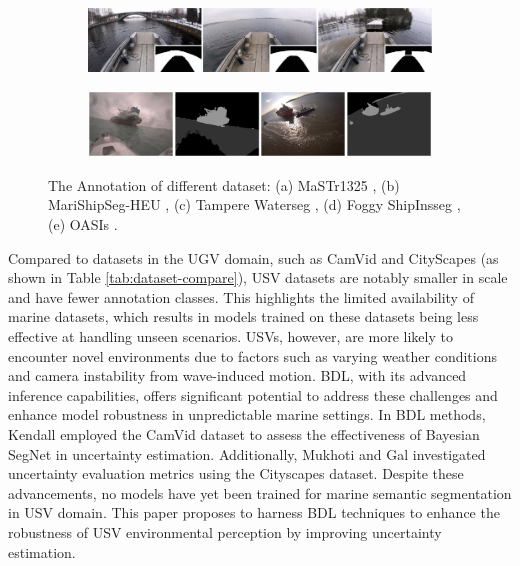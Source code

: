 \begin{figure}[ht]
\begin{minipage}{0.49\textwidth}
\begin{subfigure}[b]{1\textwidth}
        \caption{}
        \label{fig:foggy}
    \end{subfigure}
    \hfill
    \begin{subfigure}[b]{1\textwidth}
        \centering
        \includegraphics[width=\textwidth]{figures/D_tampere-waterseg.jpg}
        \caption{}
        \label{fig:tampere}
    \end{subfigure}
    \end{minipage}
    \hfill
    \centering
    \begin{subfigure}[b]{0.9\textwidth}
        \centering
        \includegraphics[width=\textwidth]{figures/OASIs/official-annotation.png}
        \caption{}
        \label{fig:oasis}
    \end{subfigure}
    \caption{The Annotation of different dataset: (a) MaSTr1325 \cite{MaSTr1325}, (b) MariShipSeg-HEU \cite{marishipseg},
    (c) Tampere Waterseg \cite{tampere}, (d) Foggy ShipInsseg \cite{foggy}, (e) OASIs \cite{OASIs}.}
    \label{fig:dataset-compare}
\end{figure}

Compared to datasets in the UGV domain, such as CamVid \cite{CamVid} and CityScapes \cite{Cityscapes} 
(as shown in Table \ref{tab:dataset-compare}), USV datasets are notably smaller in scale and have fewer annotation 
classes. This highlights the limited availability of marine datasets, which results in models trained on these 
datasets being less effective at handling unseen scenarios. USVs, however, are more likely to encounter novel 
environments due to factors such as varying weather conditions and camera instability from wave-induced motion. 
BDL, with its advanced inference capabilities, offers significant potential to address these challenges and enhance 
model robustness in unpredictable marine settings. In BDL methods, Kendall \cite{whatuncertaintydoweneed} employed 
the CamVid dataset to assess the effectiveness of Bayesian SegNet in uncertainty estimation. Additionally, Mukhoti 
and Gal \cite{evaluateBDL} investigated uncertainty evaluation metrics using the Cityscapes dataset. Despite these 
advancements, no models have yet been trained for marine semantic segmentation in USV domain. This paper proposes 
to harness BDL techniques to enhance the robustness of USV environmental perception by improving uncertainty 
estimation.

